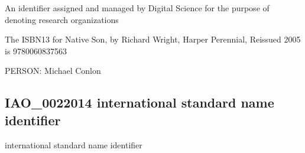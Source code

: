 \documentclass[letterpaper,10pt,english]{sphinxmanual}
\begin{document}
\begin{sphinxShadowBox}

\sphinxAtStartPar
{\hyperref[\detokenize{doc-IAO_0000578::doc}]{}}
\end{sphinxShadowBox}

\begin{sphinxShadowBox}

\sphinxAtStartPar
An identifier assigned and managed by Digital Science for the purpose of denoting research organizations
\end{sphinxShadowBox}

\begin{sphinxShadowBox}

\sphinxAtStartPar
{}
\end{sphinxShadowBox}

\begin{sphinxShadowBox}

\sphinxAtStartPar
The ISBN\sphinxhyphen{}13 for Native Son, by Richard Wright, Harper Perennial, Reissued 2005 is 978\sphinxhyphen{}0\sphinxhyphen{}06\sphinxhyphen{}083756\sphinxhyphen{}3
\end{sphinxShadowBox}

\begin{sphinxShadowBox}

\sphinxAtStartPar
{}
\end{sphinxShadowBox}

\begin{sphinxShadowBox}

\sphinxAtStartPar
PERSON: Michael Conlon
\end{sphinxShadowBox}
\begin{quote}

\ignorespaces \end{quote}


\subsection{IAO\_0022014 \sphinxhyphen{} international standard name identifier}
\label{\detokenize{doc-IAO_0022014:iao-0022014-international-standard-name-identifier}}\label{\detokenize{doc-IAO_0022014:index-0}}\label{\detokenize{doc-IAO_0022014::doc}}
\begin{sphinxShadowBox}

\sphinxAtStartPar
international standard name identifier
\end{sphinxShadowBox}
\end{document}
